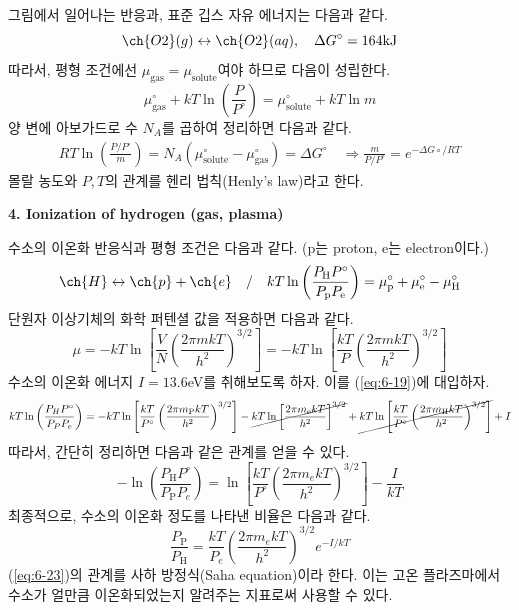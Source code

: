 \documentclass{article}
\begin{document}
그림에서 일어나는 반응과, 표준 깁스 자유 에너지는 다음과 같다.
\begin{equation}
    \ch{O2} (g) \leftrightarrow \ch{O2} (aq), \quad \Delta G^\circ = 164\text{kJ}
\end{equation}
따라서, 평형 조건에선 $\mu_\text{gas} = \mu_\text{solute}$여야 하므로 다음이 성립한다.
\begin{equation}
    \mu_\text{gas}^\circ  + kT \ln \left( \frac{P}{P^\circ} \right) = \mu_\text{solute}^\circ + kT \ln m
\end{equation}
양 변에 아보가드로 수 $N_A$를 곱하여 정리하면 다음과 같다.
\begin{align}
    RT \ln \left( \frac{P/P^\circ}{m} \right) = N_A (\mu_\text{solute}^\circ - \mu_\text{gas}^\circ) = \Delta G^\circ \quad \Rightarrow \boxed{\frac{m}{P/P^\circ} = e^{-\Delta G\circ / RT}}
\end{align}
몰랄 농도와 $P,T$의 관계를 헨리 법칙(Henly's law)라고 한다.

\vspace{3mm} \noindent
\textbf{4. Ionization of hydrogen (gas, plasma)}

수소의 이온화 반응식과 평형 조건은 다음과 같다. (p는 proton, e는 electron이다.)
\begin{equation}\label{eq:6-19}
    \ch{H} \leftrightarrow \ch{p} + \ch{e} \quad / \quad kT \ln \left( \frac{P_\text{H} P^\circ}{P_\text{p} P_\text{e}} \right) = \mu_\text{p}^\circ + \mu_\text{e}^\circ - \mu_\text{H}^\circ
\end{equation}
단원자 이상기체의 화학 퍼텐셜 값을 적용하면 다음과 같다.
\begin{equation}
    \mu = -kT \ln \left[ \frac{V}{N} \left( \frac{2 \pi m k T}{h^2} \right)^{3/2} \right]
= -kT \ln \left[ \frac{kT}{P} \left( \frac{2 \pi m k T}{h^2} \right)^{3/2} \right]
\end{equation}
수소의 이온화 에너지 $I= 13.6$eV를 취해보도록 하자. 이를 (\ref{eq:6-19})에 대입하자.
\begin{equation}
    kT \ln\left( \frac{P_H P^\circ}{P_P P_e} \right) = -kT \ln \left[ \frac{kT}{P^\circ} \left( \frac{2\pi m_\text{P} kT}{h^2} \right)^{3/2} \right]- \cancel{ kT \ln \left[ \frac{2\pi m_\text{e} kT}{h^2} \right]^{3/2}} + \cancel{kT \ln \left[ \frac{kT}{P^\circ} \left( \frac{2\pi m_\text{H} kT}{h^2} \right)^{3/2} \right]} + I
\end{equation}
따라서, 간단히 정리하면 다음과 같은 관계를 얻을 수 있다.
\begin{equation}
    - \ln \left( \frac{P_\text{H} P^\circ}{P_\text{P} P_e} \right) = \ln \left[ \frac{kT}{P^\circ} \left( \frac{2\pi m_e kT}{h^2} \right)^{3/2} \right] - \frac{I}{kT}
\end{equation}
최종적으로, 수소의 이온화 정도를 나타낸 비율은 다음과 같다.
\begin{equation}\label{eq:6-23}
    \boxed{\frac{P_\text{P}}{P_\text{H}} = \frac{kT}{P_e} \left( \frac{2\pi m_e kT}{h^2} \right)^{3/2} e^{-I/kT}}
\end{equation}
(\ref{eq:6-23})의 관계를 사하 방정식(Saha equation)이라 한다. 이는 고온 플라즈마에서 수소가 얼만큼 이온화되었는지 알려주는 지표로써 사용할 수 있다.
\end{document}

